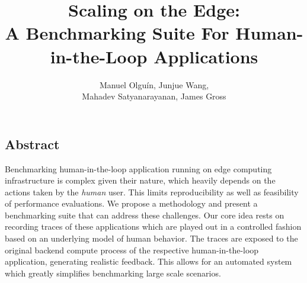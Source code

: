 \documentclass[portrait, a1]{KTHEEposter}
\begin{document}
    
    \title{\LARGE\bfseries Scaling on the Edge:\\A Benchmarking Suite For Human-in-the-Loop Applications}
    
    \author{\Large Manuel Olguín, Junjue Wang,\\Mahadev Satyanarayanan, James Gross}
    \maketitle
    
    \begin{pcolumns}[3]
        \begin{pcolumn}[2]
            \begin{pframe}[.7]
                \section{Abstract}
                Benchmarking human-in-the-loop application running on edge computing infrastructure is complex given their nature, which heavily depends on the actions taken by the \emph{human} user.
                This limits reproducibility as well as feasibility of performance evaluations.
                We propose a methodology and present a benchmarking suite that can address these challenges.
                Our core idea rests on recording traces of these applications which are played out in a controlled fashion based on an underlying model of human behavior.
                The traces are exposed to the original backend compute process of the respective human-in-the-loop application, generating realistic feedback.
                This allows for an automated system which greatly simplifies benchmarking large scale scenarios.
            \end{pframe}
            \begin{pframe}[1.3]

\end{pframe}
\end{pcolumn}
\end{pcolumns}
\end{document}
